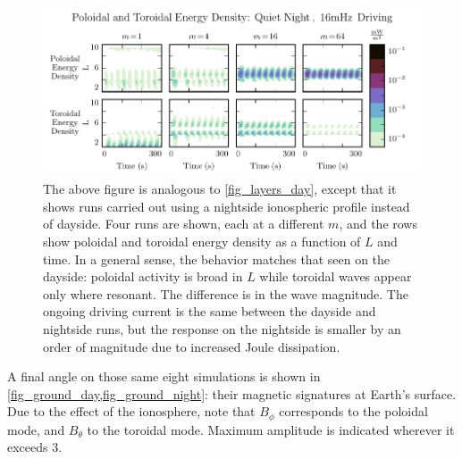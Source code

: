 \documentclass[draft,linenumbers]{agujournal}
\begin{document}
\begin{figure}
    \begin{center}
    \includegraphics[width=\textwidth]{figures/fig_layers_night.pdf}
    \caption{
        The above figure is analogous to \cref{fig_layers_day}, except that it shows runs carried out using a nightside ionospheric profile instead of dayside. Four runs are shown, each at a different $m$, and the rows show poloidal and toroidal energy density as a function of $L$ and time. In a general sense, the behavior matches that seen on the dayside: poloidal activity is broad in $L$ while toroidal waves appear only where resonant. The difference is in the wave magnitude. The ongoing driving current is the same between the dayside and nightside runs, but the response on the nightside is smaller by an order of magnitude due to increased Joule dissipation.
    }
    \label{fig_layers_night}
    \end{center}
\end{figure}

A final angle on those same eight simulations is shown in \cref{fig_ground_day,fig_ground_night}: their magnetic signatures at Earth's surface. Due to the effect of the ionosphere, note that $B_\phi$ corresponds to the poloidal mode, and $B_\theta$ to the toroidal mode. Maximum amplitude is indicated wherever it exceeds \SI{3}{\nT}.
\end{document}
